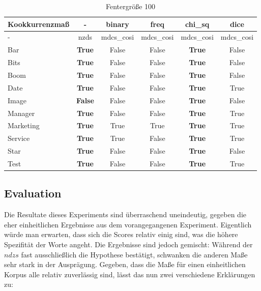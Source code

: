 \documentclass[11pt,numbers=noenddot]{scrartcl}
\begin{document}
\begin{table}[h]
    \begin{center}
        \begin{tabular}{ l | *{5}{c}  }
            Kookkurrenzmaß & - & binary & freq & chi\_sq & dice \\ \hline
               -      & nzds   &  mdcs\_cosi & mdcs\_cosi & mdcs\_cosi & mdcs\_cosi  \\ \hline
            Bar      &  \textbf{True}   &  False     &   False   &  \textbf{True}   & False    \\
            Bits     &  \textbf{True}   &  False     &   False   &  \textbf{True}   & False    \\
            Boom     &  \textbf{True}   &  False     &   False   &  \textbf{True}   & False    \\
            Date     &  \textbf{True}   &  False     &   False   &  \textbf{True}   & True   \\
            Image    &  \textbf{False}  &  False     &   False   &  \textbf{True}   & False   \\
            Manager  &  \textbf{True}   &  False     &   False   &  \textbf{True}   & True  \\
            Marketing&  \textbf{True}   &  True      &   True    &  \textbf{True}   & True   \\
            Service  &  \textbf{True}   &  True      &   False   &  \textbf{True}   & True   \\
            Star     &  \textbf{True}   &  False     &   False   &  \textbf{True}   & False  \\
            Test     &  \textbf{True}   &  False     &   False   &  \textbf{True}   & True
        \end{tabular}
    \end{center}
    \caption{Fentergröße 100}
\end{table}

\subsection{Evaluation}

Die Resultate dieses Experiments sind überraschend uneindeutig, gegeben die eher einheitlichen Ergebnisse aus dem vorangegangenen Experiment. Eigentlich würde man erwarten, dass sich die Scores relativ einig sind, was die höhere Spezifität der Worte angeht. Die Ergebnisse sind jedoch gemischt: Während der $ndzs$ fast ausschließlich die Hypothese bestätigt, schwanken die anderen Maße sehr stark in der Ausprägung. Gegeben, dass die Maße für einen einheitlichen Korpus alle relativ zuverlässig sind, lässt das nun zwei verschiedene Erklärungen zu:
\end{document}
